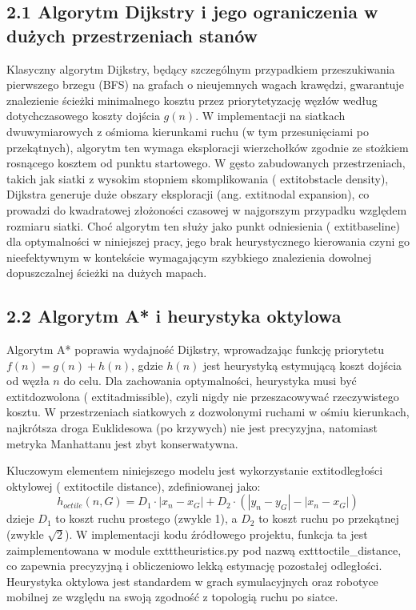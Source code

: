 \documentclass[conference]{IEEEtran}
\begin{document}
\subsection{2.1 Algorytm Dijkstry i jego ograniczenia w dużych przestrzeniach stanów}
Klasyczny algorytm Dijkstry, będący szczególnym przypadkiem przeszukiwania pierwszego brzegu (BFS) na grafach o nieujemnych wagach krawędzi, gwarantuje znalezienie ścieżki minimalnego kosztu przez priorytetyzację węzłów według dotychczasowego koszty dojścia $g(n)$\cite{tang2025routing}. W implementacji na siatkach dwuwymiarowych z ośmioma kierunkami ruchu (w tym przesunięciami po przekątnych), algorytm ten wymaga eksploracji wierzchołków zgodnie ze stożkiem rosnącego kosztem od punktu startowego. W gęsto zabudowanych przestrzeniach, takich jak siatki z wysokim stopniem skomplikowania (	extit{obstacle density}), Dijkstra generuje duże obszary eksploracji (ang. 	extit{nodal expansion}), co prowadzi do kwadratowej złożoności czasowej w najgorszym przypadku względem rozmiaru siatki. Choć algorytm ten służy jako punkt odniesienia (	extit{baseline}) dla optymalności w niniejszej pracy, jego brak heurystycznego kierowania czyni go nieefektywnym w kontekście wymagającym szybkiego znalezienia dowolnej dopuszczalnej ścieżki na dużych mapach\cite{ahmadi2024resource}.\n
\subsection{2.2 Algorytm A* i heurystyka oktylowa}
Algorytm A* poprawia wydajność Dijkstry, wprowadzając funkcję priorytetu $f(n) = g(n) + h(n)$, gdzie $h(n)$ jest heurystyką estymującą koszt dojścia od węzła $n$ do celu. Dla zachowania optymalności, heurystyka musi być 	extit{dozwolona} (	extit{admissible}), czyli nigdy nie przeszacowywać rzeczywistego kosztu\cite{casasramos2025declarealign}. W przestrzeniach siatkowych z dozwolonymi ruchami w ośmiu kierunkach, najkrótsza droga Euklidesowa (po krzywych) nie jest precyzyjna, natomiast metryka Manhattanu jest zbyt konserwatywna. 

Kluczowym elementem niniejszego modelu jest wykorzystanie 	extit{odległości oktylowej} (	extit{octile distance}), zdefiniowanej jako:
\begin{equation}
    h_{octile}(n, G) = D_1 \cdot |x_n - x_G| + D_2 \cdot (|y_n - y_G| - |x_n - x_G|)
\end{equation}
dzieje $D_1$ to koszt ruchu prostego (zwykle 1), a $D_2$ to koszt ruchu po przekątnej (zwykle $\sqrt{2}$). W implementacji kodu źródłowego projektu, funkcja ta jest zaimplementowana w module 	exttt{heuristics.py} pod nazwą 	exttt{octile\_distance}, co zapewnia precyzyjną i obliczeniowo lekką estymację pozostałej odległości. Heurystyka oktylowa jest standardem w grach symulacyjnych oraz robotyce mobilnej ze względu na swoją zgodność z topologią ruchu po siatce\cite{wang2026vikpath}.\n
\end{document}
